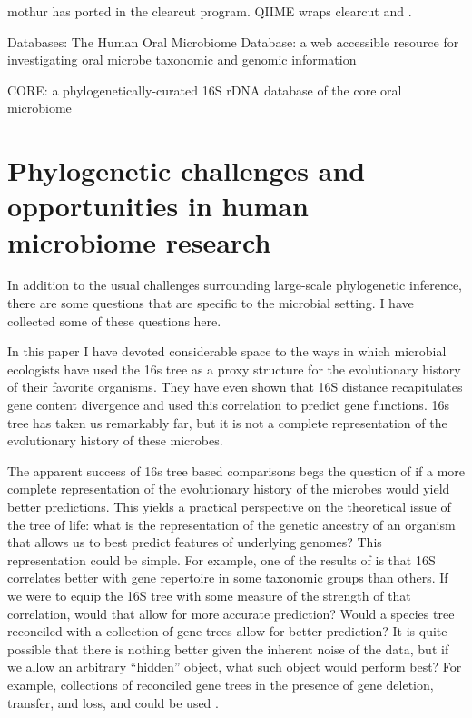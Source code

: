 \documentclass{amsart}
\begin{document}
mothur has ported in the clearcut \citep{evans2006relaxed,sheneman2006clearcut} program.
QIIME wraps clearcut and \citep{price2010fasttree}.

Databases:
\citep{chen2010human}
The Human Oral Microbiome Database: a web accessible resource for investigating oral microbe taxonomic and genomic information

\citep{griffen2011core}
CORE: a phylogenetically-curated 16S rDNA database of the core oral microbiome

\citep{srinivasan2012bacterial}


\section{Phylogenetic challenges and opportunities in human microbiome research}

In addition to the usual challenges surrounding large-scale phylogenetic inference, there are some questions that are specific to the microbial setting.
I have collected some of these questions here.

In this paper I have devoted considerable space to the ways in which microbial ecologists have used the 16s tree as a proxy structure for the evolutionary history of their favorite organisms.
They have even shown that 16S distance recapitulates gene content divergence and used this correlation to predict gene functions.
16s tree has taken us remarkably far, but it is not a complete representation of the evolutionary history of these microbes.

The apparent success of 16s tree based comparisons begs the question of if a more complete representation of the evolutionary history of the microbes would yield better predictions.
This yields a practical perspective on the theoretical issue of the tree of life: what is the representation of the genetic ancestry of an organism that allows us to best predict features of underlying genomes?
This representation could be simple.
For example, one of the results of \citet{zaneveld2010ribosomal} is that 16S correlates better with gene repertoire in some taxonomic groups than others.
If we were to equip the 16S tree with some measure of the strength of that correlation, would that allow for more accurate prediction?
Would a species tree reconciled with a collection of gene trees allow for better prediction?
It is quite possible that there is nothing better given the inherent noise of the data, but if we allow an arbitrary ``hidden'' object, what such object would perform best?
For example, collections of reconciled gene trees in the presence of gene deletion, transfer, and loss, and could be used \citep[see][for interesting recent results]{szollHosi2013lateral,szollHosi2013efficient}.
\end{document}
